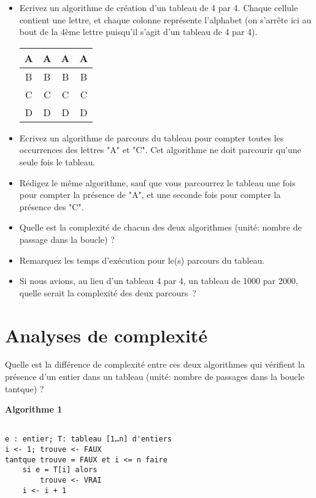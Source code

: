 \begin{itemize}
  \item  Ecrivez un algorithme de création d'un tableau de 4 par 4. Chaque cellule contient une lettre, et chaque colonne représente l'alphabet (on s'arrête ici au bout de la 4ème lettre puisqu'il s'agit d'un tableau de 4 par 4).

\begin{tabular}{c|c|c|c}
A&A&A&A\\
\hline
B&B&B&B\\
\hline
C&C&C&C\\
\hline
D&D&D&D\\
\end{tabular}

  \item  Ecrivez un algorithme de parcours du tableau pour compter toutes les occurrences des lettres "A" et "C". Cet algorithme ne doit parcourir qu'une seule fois le tableau.
  \item  Rédigez le même algorithme, sauf que vous parcourrez le tableau une fois pour compter la présence de "A", et une seconde fois pour compter la présence des "C".
  \item  Quelle est la complexité de chacun des deux algorithmes (unité: nombre de passage dans la boucle) ?
  \item  Remarquez les temps d'exécution pour le(s) parcours du tableau. 
  \item  Si nous avions, au lieu d'un tableau 4 par 4, un tableau de 1000 par 2000, quelle serait la complexité des deux parcours ?
\end{itemize}

\section{Analyses de complexité}

 Quelle est la différence de complexité entre ces deux algorithmes qui vérifient la présence d'un entier dans un tableau (unité: nombre de passages dans la boucle tantque) ?

\vspace{0.5cm}

\textbf{Algorithme 1}
\vspace{-0.3cm}
\begin{verbatim}

e : entier; T: tableau [1…n] d'entiers
i <- 1; trouve <- FAUX
tantque trouve = FAUX et i <= n faire
    si e = T[i] alors
        trouve <- VRAI
    i <- i + 1
\end{verbatim}


